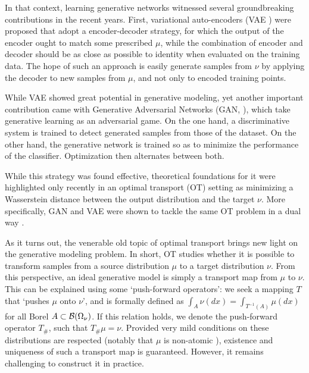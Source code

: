 In that context, learning generative networks witnessed several groundbreaking contributions in the recent years. First, variational auto-encoders (VAE \cite{kingma2013VAE}) were proposed that adopt a encoder-decoder strategy, for which the output of the encoder ought to match some prescribed $\mu$, while the combination of encoder and decoder should be as close as possible to identity when evaluated on the training data. The hope of such an approach is easily generate samples from $\nu$ by applying the decoder to new samples from $\mu$, and not only to encoded training points.%

While VAE showed great potential in generative modeling, yet another important contribution came with Generative Adversarial Networks (GAN, \cite{goodfellow2014generative,salimans2016improved,eghbal2017probabilistic}), which take generative learning as an adversarial game. On the one hand, a discriminative system is trained to detect generated samples from those of the dataset. On the other hand, the generative network is trained so as to minimize the performance of the classifier. Optimization then alternates between both.


While this strategy was found effective, theoretical foundations for it were highlighted only recently \cite{bousquet2017optimal} in an optimal transport (OT) setting as minimizing a Wasserstein distance between the output distribution and the target $\nu$. More specifically, GAN and VAE were shown to tackle the same OT problem in a dual way \cite{bousquet2017optimal,genevay2017gan}.

As it turns out, the venerable old topic of optimal transport brings new light on the generative modeling problem. In short, OT studies whether it is possible to transform samples from a source distribution $\mu$ to a target distribution $\nu$. From this perspective, an ideal generative model is simply a transport map from $\mu$ to $\nu$.
%
This can be explained using some `push-forward operators': we seek a mapping $T$ that `pushes $\mu$ onto $\nu$', and is formally defined as $\int_A \nu(dx) = \int_{T^{-1}(A)} \mu(dx) $ for all Borel $A \subset {\cal B}(\Omega_\nu)$. If this relation holds, we denote the push-forward operator $T_\#$, such that $T_\# \mu = \nu$. Provided very mild conditions on these distributions are respected (notably that $\mu$ is non-atomic \cite{villani2008optimal}), existence and uniqueness of such a transport map is guaranteed. However, it remains challenging to construct it in practice.

